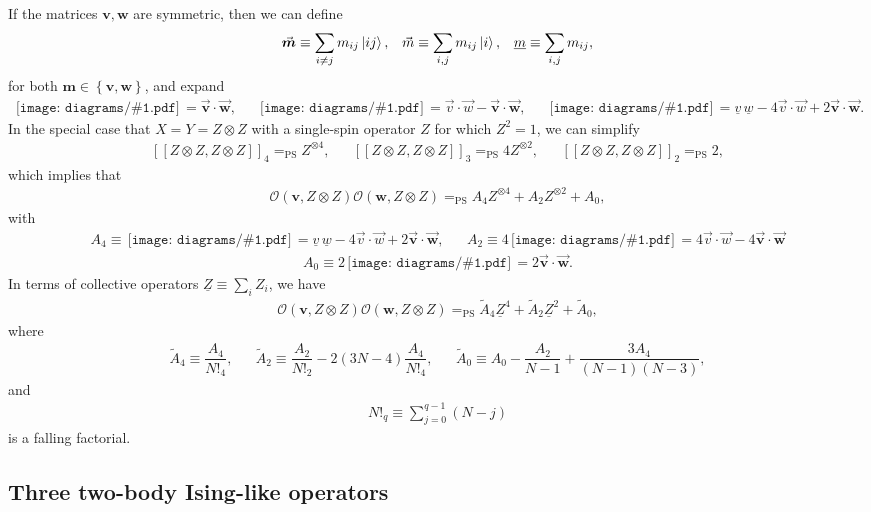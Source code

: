 \documentclass[nofootinbib,notitlepage,11pt]{revtex4-2}
\newcommand{\f}[2]{\dfrac{#1}{#2}} %
\newcommand{\p}[1]{\left(#1\right)} %
\renewcommand{\sp}[1]{\left[#1\right]} %
\newcommand{\spp}[1]{\sp{\sp{#1}}} %
\renewcommand{\set}[1]{\left\{#1\right\}} %
\renewcommand{\c}{\cdot} %
\newcommand{\m}{\bm} %
\renewcommand{\v}{\vec} %
\newcommand{\1}{\mathds{1}}
\renewcommand{\O}{\mathcal{O}}
\newcommand{\EQPS}{=_{\text{PS}}}
\newcommand{\col}{\underline}
\newcommand{\diagram}[1]
{\,\texttt{[image: diagrams/\#1.pdf]}\,}
\begin{document}
If the matrices $\m v,\m w$ are symmetric, then we can define
\begin{align}
  \v{\m m} \equiv \sum_{i\ne j} m_{ij} \ket{ij},
  &&
  \v m \equiv \sum_{i,j} m_{ij} \ket{i},
  &&
  \col{m} \equiv \sum_{i,j} m_{ij},
\end{align}
for both $\m m\in\set{\m v,\m w}$, and expand
\begin{align}
  \diagram{two_body_2} = \v{\m v} \c\v{\m w},
  &&
  \diagram{two_body_1} =
  \v v \c \v w - \v{\m v} \c \v{\m w},
  &&
  \diagram{two_body_0}
  = \col{v}\,\col{w} - 4 \v v\c\v w + 2 \v{\m v}\c\v{\m w}.
\end{align}
In the special case that $X=Y=Z\otimes Z$ with a single-spin operator
$Z$ for which $Z^2=1$, we can simplify
\begin{align}
  \spp{Z\otimes Z,Z\otimes Z}_4 \EQPS Z^{\otimes 4},
  &&
  \spp{Z\otimes Z,Z\otimes Z}_3 \EQPS 4 Z^{\otimes 2},
  &&
  \spp{Z\otimes Z,Z\otimes Z}_2 \EQPS 2,
\end{align}
which implies that
\begin{align}
  \O\p{\m v,Z\otimes Z} \O\p{\m w,Z\otimes Z}
  \EQPS A_4 Z^{\otimes 4} + A_2 Z^{\otimes 2} + A_0,
\end{align}
with
\begin{align}
  A_4 \equiv \diagram{two_body_0}
  = \col{v}\,\col{w} - 4 \v v\c\v w + 2 \v{\m v}\c\v{\m w},
  &&
  A_2 \equiv 4 \diagram{two_body_1}
  = 4 \v v \c \v w - 4 \v{\m v} \c \v{\m w}
\end{align}
\begin{align}
  A_0 \equiv 2 \diagram{two_body_2} = 2 \v{\m v} \c\v{\m w}.
\end{align}
In terms of collective operators $\col{Z}\equiv\sum_iZ_i$, we have
\begin{align}
  \O\p{\m v,Z\otimes Z} \O\p{\m w,Z\otimes Z}
  \EQPS \tilde A_4 \col{Z}^4 + \tilde A_2 \col{Z}^2 + \tilde A_0,
\end{align}
where
\begin{align}
  \tilde A_4 \equiv \f{A_4}{N!_4},
  &&
  \tilde A_2 \equiv \f{A_2}{N!_2} - 2\p{3N-4} \f{A_4}{N!_4},
  &&
  \tilde A_0 \equiv A_0 - \f{A_2}{N-1} + \f{3A_4}{\p{N-1}\p{N-3}},
\end{align}
and
\begin{align}
  N!_q \equiv \sum_{j=0}^{q-1} \p{N-j}
\end{align}
is a falling factorial.

\subsection{Three two-body Ising-like operators}
\end{document}
